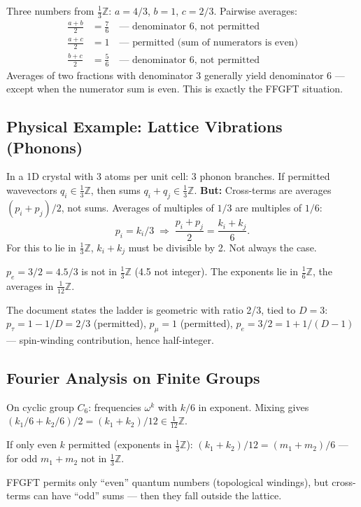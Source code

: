 Three numbers from $\tfrac{1}{3}\mathbb{Z}$: $a=4/3$, $b=1$, $c=2/3$. Pairwise averages:
\begin{align*}
  \frac{a+b}{2} &= \frac{7}{6} \quad\text{--- denominator 6, not permitted} \\
  \frac{a+c}{2} &= 1 \quad\text{--- permitted (sum of numerators is even)} \\
  \frac{b+c}{2} &= \frac{5}{6} \quad\text{--- denominator 6, not permitted}
\end{align*}
Averages of two fractions with denominator 3 generally yield denominator 6
--- except when the numerator sum is even. This is exactly the FFGFT situation.

\subsection{Physical Example: Lattice Vibrations (Phonons)}

In a 1D crystal with 3 atoms per unit cell: 3 phonon branches.
If permitted wavevectors $q_i\in\tfrac{1}{3}\mathbb{Z}$,
then sums $q_i+q_j\in\tfrac{1}{3}\mathbb{Z}$.
\textbf{But:} Cross-terms are averages $(p_i+p_j)/2$, not sums.
Averages of multiples of $1/3$ are multiples of $1/6$:
\[
  p_i=k_i/3 \;\Rightarrow\; \frac{p_i+p_j}{2}=\frac{k_i+k_j}{6}.
\]
For this to lie in $\tfrac{1}{3}\mathbb{Z}$, $k_i+k_j$ must be divisible by 2.
Not always the case.

$p_e=3/2=4.5/3$ is not in $\tfrac{1}{3}\mathbb{Z}$ (4.5 not integer).
The exponents lie in $\tfrac{1}{6}\mathbb{Z}$,
the averages in $\tfrac{1}{12}\mathbb{Z}$.

The document states the ladder is geometric with ratio 2/3, tied to $D=3$:
$p_\tau=1-1/D=2/3$ (permitted), $p_\mu=1$ (permitted),
$p_e=3/2=1+1/(D-1)$ --- spin-winding contribution, hence half-integer.

\subsection{Fourier Analysis on Finite Groups}

On cyclic group $C_6$: frequencies $\omega^k$ with $k/6$ in exponent.
Mixing gives $(k_1/6+k_2/6)/2=(k_1+k_2)/12\in\tfrac{1}{12}\mathbb{Z}$.

If only even $k$ permitted (exponents in $\tfrac{1}{3}\mathbb{Z}$):
$(k_1+k_2)/12=(m_1+m_2)/6$ --- for odd $m_1+m_2$ not in $\tfrac{1}{3}\mathbb{Z}$.

FFGFT permits only ``even'' quantum numbers (topological windings),
but cross-terms can have ``odd'' sums --- then they fall outside the lattice.


